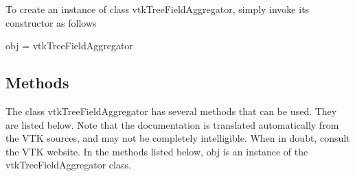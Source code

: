 To create an instance of class vtk\-Tree\-Field\-Aggregator, simply invoke its constructor as follows \begin{DoxyVerb}  obj = vtkTreeFieldAggregator
\end{DoxyVerb}
 \hypertarget{vtkwidgets_vtkxyplotwidget_Methods}{}\subsection{Methods}\label{vtkwidgets_vtkxyplotwidget_Methods}
The class vtk\-Tree\-Field\-Aggregator has several methods that can be used. They are listed below. Note that the documentation is translated automatically from the V\-T\-K sources, and may not be completely intelligible. When in doubt, consult the V\-T\-K website. In the methods listed below, {\ttfamily obj} is an instance of the vtk\-Tree\-Field\-Aggregator class. 
